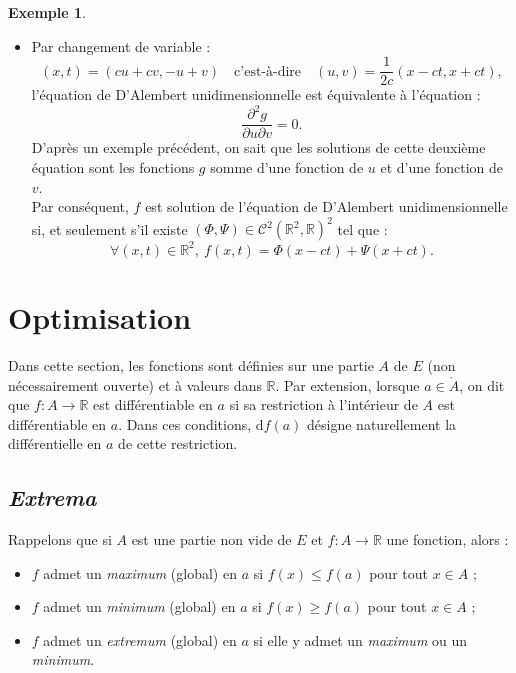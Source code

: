 \documentclass[french]{article}
\newcommand{\R}{\mathbb{R}}
\renewcommand{\d}{\text{d}}
\theoremstyle{plain}
\theoremstyle{definition}
\newtheorem*{ex}{Exemple}
\theoremstyle{remark}
\begin{document}
\begin{ex}
\begin{enumerate}
\begin{itemize}
\begin{align*}
			\end{align*} où la dernière relation a été obtenue par le théorème de Schwarz. En prenant $\alpha=\beta=c$ et $\delta=-\gamma=-1$, on a $\alpha\delta-\beta\gamma=2c\ne0$ et ainsi :
			$$\frac{\partial^2g}{\partial x\partial t}=c^2\frac{\partial^2f}{\partial x^2}-\frac{\partial f^2}{\partial t^2}.$$
			\item Par changement de variable :
			$$(x,t)=(cu+cv,-u+v)\quad\text{c'est-à-dire}\quad(u,v)=\frac{1}{2c}(x-ct,x+ct),$$ l'équation de D'Alembert unidimensionnelle est équivalente à l'équation :
			$$\frac{\partial^2g}{\partial u\partial v}=0.$$
			D'après un exemple précédent, on sait que les solutions de cette deuxième équation sont les fonctions $g$ somme d'une fonction de $u$ et d'une fonction de $v$. \\
			Par conséquent, $f$ est solution de l'équation de D'Alembert unidimensionnelle si, et seulement s'il existe $(\Phi,\Psi)\in\mathcal{C}^2(\R^2,\R)^2$ tel que :
			$$\forall (x,t)\in\R^2,\ f(x,t)=\Phi(x-ct)+\Psi(x+ct).$$
		\end{itemize}
	\end{enumerate}
\end{ex}

\section{Optimisation}

Dans cette section, les fonctions sont définies sur une partie $A$ de $E$ (non nécessairement ouverte) et à valeurs dans $\R$. Par extension, lorsque $a\in\mathring{A}$, on dit que $f:A\to\R$ est différentiable en $a$ si sa restriction à l'intérieur de $A$ est différentiable en $a$. Dans ces conditions, $\d f(a)$ désigne naturellement la différentielle en $a$ de cette restriction.

\subsection{\textit{Extrema}}

Rappelons que si $A$ est une partie non vide de $E$ et $f:A\to\R$ une fonction, alors :
\begin{itemize}
	\item $f$ admet un \textit{maximum} (global) en $a$ si $f(x)\leqslant f(a)$ pour tout $x\in A$ ;
	\item $f$ admet un \textit{minimum} (global) en $a$ si $f(x)\geqslant f(a)$ pour tout $x\in A$ ;
	\item $f$ admet un \textit{extremum} (global) en $a$ si elle y admet un \textit{maximum} ou un \textit{minimum}.
\end{itemize}
\end{document}
